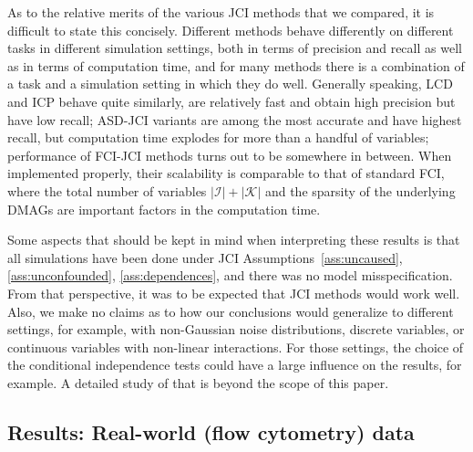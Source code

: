 \documentclass[twoside,11pt]{article}
\newcommand\C[1]{\mathcal{#1}}
\newcommand{\JCIABC}{\ref{ass:uncaused}, \ref{ass:unconfounded}, \ref{ass:dependences}}
\begin{document}
As to the relative merits of the various JCI methods that we compared, it is
difficult to state this concisely. Different methods behave differently on
different tasks in different simulation settings, both in terms of precision
and recall as well as in terms of computation
time, and for many methods there is a combination of a task and a simulation
setting in which they do well. Generally speaking, LCD and ICP behave quite
similarly, are relatively fast and obtain high precision but have low recall;
ASD-JCI variants are among the most accurate and have highest recall, but
computation time explodes for more than a handful of variables; performance of
FCI-JCI methods turns out to be somewhere in between.
When implemented properly, their scalability is comparable to that of 
standard FCI, where the total number of variables $|\C{I}| + |\C{K}|$ and the 
sparsity of the underlying DMAGs are important factors in the computation time.

Some aspects that should be kept in mind when interpreting these results is
that all simulations have been done under JCI Assumptions~\JCIABC, and
there was no model misspecification. From that perspective, it was to be
expected that JCI methods would work well. Also, we make no claims as to how
our conclusions would generalize to different settings, for example, with 
non-Gaussian noise distributions, discrete variables, or continuous variables 
with non-linear interactions. For those settings, the choice of the conditional
independence tests could have a large influence on the results, for example. 
A detailed study of that is beyond the scope of this paper.


\subsection{Results: Real-world (flow cytometry) data\label{sec:exp_sachs}}
\end{document}

